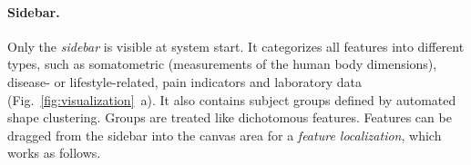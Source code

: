 \documentclass[journal]{style/vgtc} 			          %
\begin{document}
\paragraph{Sidebar.}
Only the \emph{sidebar} is visible at system start.
%
It categorizes all features into different types, such as somatometric (measurements of the human body dimensions), disease- or lifestyle-related, pain indicators and laboratory data (Fig.~\ref{fig:visualization}~a).
%
It also contains subject groups defined by automated shape clustering.
%
Groups are treated like dichotomous features. %
%
Features can be dragged from the sidebar into the canvas area for a \emph{feature localization}, which works as follows.
%
\end{document}
